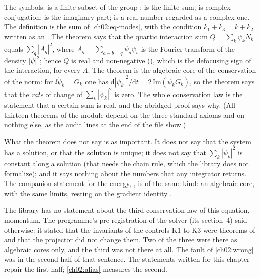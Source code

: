 The symbols:  is a finite subset of the group ;  is the finite sum;  is complex conjugation;  is the imaginary part;
 is a real number regarded as a complex one. The definition  is the sum of \cref{ch02:eq-modes}, with the condition
$k_1+k_3=k+k_2$ written as an . The theorem  says that the quartic interaction sum $Q=\sum_k\overline{\psi_k}N_k$ equals $\sum_q|A_q|^2$, where
$A_q=\sum_{a-b=q}\psi_a\overline{\psi_b}$ is the Fourier transform of the density $|\psi|^2$; hence $Q$ is real and non-negative (), which
is the defocusing sign of the interaction, for every $\Lambda$. The theorem  is the algebraic core of the conservation of the norm: for
$\ii\dot\psi_k=G_k$ one has $\mathrm d|\psi_k|^2/\mathrm dt=2\,\mathrm{Im}(\overline{\psi_k}G_k)$, so the theorem says that the \emph{rate} of change of $\sum_k|\psi_k|^2$ is zero.
The whole conservation law is the statement that a certain sum is real, and the abridged proof says why. (All thirteen theorems of the module depend on the three standard axioms and on nothing else, as the audit lines at the end of the file show.)

What the theorem does not say is as important. It does not say that the system has a solution, or that the solution is unique; it does not say that
$\sum_k|\psi_k|^2$ is constant along a solution (that needs the chain rule, which the library does not formalize); and it says nothing about the numbers that any
integrator returns. The companion statement for the energy, , is of the same kind: an algebraic core, with the same limits, resting on the gradient identity
.

The library has no statement about the third conservation law of this equation, momentum. The programme's pre-registration of the solver (its section~4) said otherwise: it
stated that the invariants of the controls K1 to K3 were theorems of  and that the projector did not change them. Two of the three were
there as algebraic cores only, and the third was not there at all. The fault of \cref{ch02:wrong} was in the second half of that sentence. The statements written for this chapter
repair the first half; \cref{ch02:alias} measures the second.


